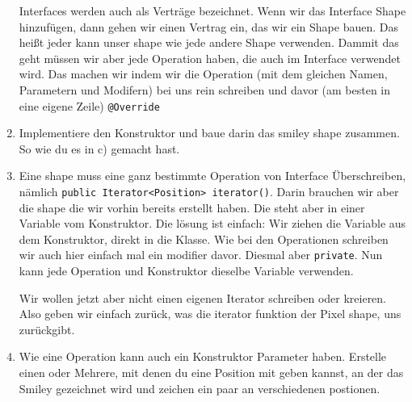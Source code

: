 \begin{enumerate}
\begin{Infobox}[Interface]
        Interfaces werden auch als Verträge bezeichnet.
        Wenn wir das Interface Shape hinzufügen, dann gehen wir einen Vertrag ein, das wir ein Shape bauen.
        Das heißt jeder kann unser shape wie jede andere Shape verwenden.
        Dammit das geht müssen wir aber jede Operation haben, die auch im Interface verwendet wird.
        Das machen wir indem wir die Operation (mit dem gleichen Namen, Parametern und Modifern) bei uns rein schreiben und davor (am besten in eine eigene Zeile) \lstinline{@Override}
    \end{Infobox}    
    \item Implementiere den Konstruktor und baue darin das smiley shape zusammen. So wie du es in c) gemacht hast.
    \item Eine shape muss eine ganz bestimmte Operation von Interface Überschreiben, nämlich \lstinline{public Iterator<Position> iterator()}.
    Darin brauchen wir aber die shape die wir vorhin bereits erstellt haben.
    Die steht aber in einer Variable vom Konstruktor.
    Die lösung ist einfach: Wir ziehen die Variable aus dem Konstruktor, direkt in die Klasse.
    Wie bei den Operationen schreiben wir auch hier einfach mal ein modifier davor. Diesmal aber \lstinline{private}.
    Nun kann jede Operation und Konstruktor dieselbe Variable verwenden.

    Wir wollen jetzt aber nicht einen eigenen Iterator schreiben oder kreieren. Also geben wir einfach zurück, was die iterator funktion der Pixel shape, uns zurückgibt.
    \item Wie eine Operation kann auch ein Konstruktor Parameter haben.
    Erstelle einen oder Mehrere, mit denen du eine Position mit geben kannst, an der das Smiley gezeichnet wird
    und zeichen ein paar an verschiedenen postionen.
\end{enumerate}

\newpage
